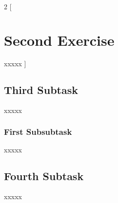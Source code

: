 \documentclass[a4paper, 11pt]{article} %
\begin{document}
\bigskip


\begin{multicols}{2}
    [
        \section{\textbf{Second Exercise}}
        xxxxx
    ]

    \subsection{\textbf{Third Subtask}}
    xxxxx

    \subsubsection{\textbf{First Subsubtask}}
    xxxxx

    \subsection{\textbf{Fourth Subtask}}
    xxxxx

\end{multicols}

\bigskip



\end{document}
